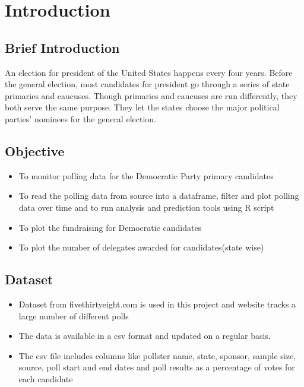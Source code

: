 \section{Introduction}
\subsection{Brief Introduction}
An election for president of the United States happens every four years. Before the general election, most candidates for president go through a series of state primaries and caucuses. Though primaries and caucuses are run differently, they both serve the same purpose. They let the states choose the major political parties’ nominees for the general election\cite{usagov}. 

\subsection{Objective}
\begin{itemize}
    \item To monitor polling data for the Democratic Party primary candidates
    \item To read the polling data from source into a dataframe, filter and plot polling data over time and to run analysis and prediction tools using R script 
    \item To plot the fundraising for Democratic candidates
    \item To plot the number of delegates awarded for candidates(state wise)
\end{itemize}

\subsection{Dataset}
\begin{itemize}
    \item Dataset from fivethirtyeight.com\cite{jr._malone_skelley_koerth_paine_dubin_sawchik_rakich} is used in this project and website tracks a large number of different polls
    \item  The data is available in a csv format and updated on a regular basis. 
    \item The csv file includes columns like pollster name, state, sponsor, sample size, source, poll start and end dates and poll results as a percentage of votes for each candidate
\end{itemize}
